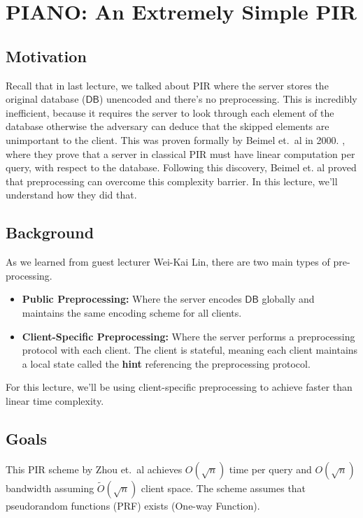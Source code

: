 \newcommand{\PRF}{\ensuremath{{\sf PRF}}}



\section{PIANO: An Extremely Simple PIR}

\subsection{Motivation}
Recall that in last lecture, we talked about  PIR where the server stores the original database ($\mathsf{DB}$) unencoded and there's no preprocessing. This is incredibly inefficient, because it requires the server to look through each element of the database otherwise the adversary can deduce that the skipped elements are unimportant to the client. This was proven formally by Beimel et.~al in 2000. \cite{beimel2000reducing}, where they prove that a server in classical PIR must have linear computation per query, with respect to the database. Following this discovery, Beimel et. al proved that preprocessing can overcome this complexity barrier. In this lecture, we'll understand how they did that.

\subsection{Background}
As we learned from guest lecturer Wei-Kai Lin, there are two main types of pre-processing.\

\begin{definition}
    \hfill
    \begin{itemize}
        \item \textbf{Public Preprocessing:} Where the server encodes $\mathsf{DB}$ globally and maintains the same encoding scheme for all clients.
        \item \textbf{Client-Specific Preprocessing:} Where the server performs a preprocessing protocol with each client. The client is stateful, meaning each client maintains a local state called the \textbf{hint} referencing the preprocessing protocol.
    \end{itemize}
\end{definition}
For this lecture, we'll be using client-specific preprocessing to achieve faster than linear time complexity.

\subsection{Goals}
This PIR scheme by Zhou et.~al achieves $O(\sqrt{n})$ time per query and $O(\sqrt{n})$ bandwidth \cite{zhou2023piano} assuming $\tilde{O}(\sqrt{n})$ client space. 
The scheme assumes that pseudorandom functions (PRF) exists (One-way Function).


